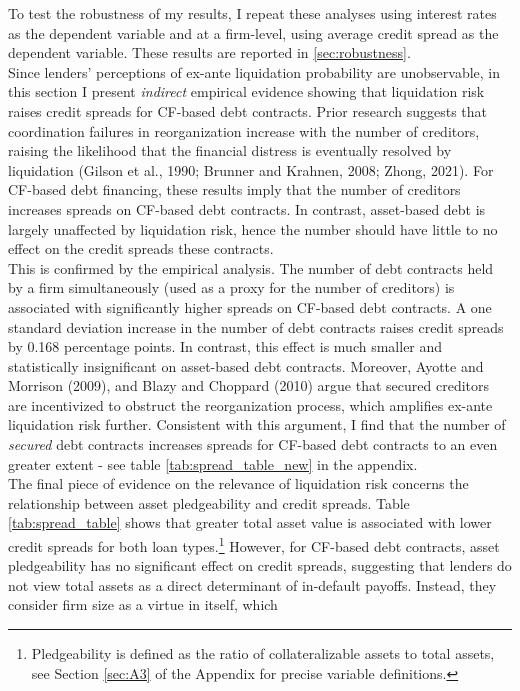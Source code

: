 \documentclass[12pt]{article}
\begin{document}
\noindent To test the robustness of my results, I repeat these analyses using interest rates as the dependent variable and at a firm-level, using average credit spread as the dependent variable. These results are reported in \ref{sec:robustness}. \vspace{3mm} \\
Since lenders' perceptions of ex-ante liquidation probability are unobservable, in this section I present \textit{indirect} empirical evidence  showing that liquidation risk raises credit spreads for CF-based debt contracts. Prior research suggests that coordination failures in reorganization increase with the number of creditors, raising the likelihood that the financial distress is eventually resolved by liquidation (Gilson et al., 1990; Brunner and Krahnen, 2008; Zhong, 2021). For CF-based debt financing, these results imply that the number of creditors increases spreads on CF-based debt contracts. In contrast, asset-based debt is largely unaffected by liquidation risk, hence the number should have little to no effect on the credit spreads these contracts. \vspace{3mm} \\
This is confirmed by the empirical analysis. The number of debt contracts held by a firm simultaneously (used as a proxy for the number of creditors) is associated with significantly higher spreads on CF-based debt contracts. A one standard deviation increase in the number of debt contracts raises credit spreads by 0.168 percentage points. In contrast, this effect is much smaller and statistically insignificant on asset-based debt contracts. Moreover, Ayotte and Morrison (2009), and Blazy and Choppard (2010) argue that secured creditors are incentivized to obstruct the reorganization process, which amplifies ex-ante liquidation risk further. Consistent with this argument, I find that the number of \textit{secured} debt contracts increases spreads for CF-based debt contracts to an even greater extent - see table \ref{tab:spread_table_new} in the appendix. \vspace{3mm} \\
The final piece of evidence on the relevance of liquidation risk concerns the relationship between asset pledgeability and credit spreads. Table \ref{tab:spread_table} shows that greater total asset value is associated with lower credit spreads for both loan types.\footnote{Pledgeability is defined as the ratio of collateralizable assets to total assets, see Section \ref{sec:A3} of the Appendix for precise variable definitions.} However, for CF-based debt contracts, asset pledgeability has no significant effect on credit spreads, suggesting that lenders do not view total assets as a direct determinant of in-default payoffs. Instead, they consider firm size as a virtue in itself, which 
\end{document}
